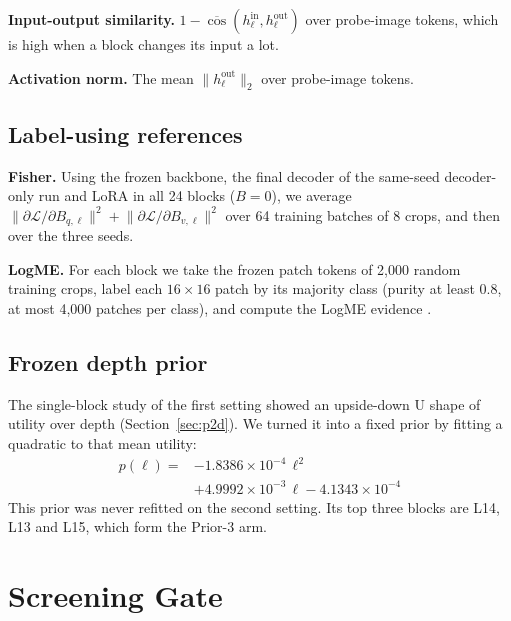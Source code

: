 \documentclass[11pt,a4paper]{report}
\begin{document}
\textbf{Input-output similarity.} $1 - \overline{\cos}(h_\ell^{\text{in}}, h_\ell^{\text{out}})$ over probe-image tokens, which is high when a block changes its input a lot.

\textbf{Activation norm.} The mean $\lVert h_\ell^{\text{out}} \rVert_2$ over probe-image tokens.

\subsection{Label-using references}

\textbf{Fisher.} Using the frozen backbone, the final decoder of the same-seed decoder-only run and LoRA in all 24 blocks ($B = 0$), we average $\lVert \partial \mathcal{L} / \partial B_{q,\ell} \rVert^2 + \lVert \partial \mathcal{L} / \partial B_{v,\ell} \rVert^2$ over 64 training batches of 8 crops, and then over the three seeds.

\textbf{LogME.} For each block we take the frozen patch tokens of 2,000 random training crops, label each $16 \times 16$ patch by its majority class (purity at least 0.8, at most 4,000 patches per class), and compute the LogME evidence \cite{you2021logme}.

\subsection{Frozen depth prior}

The single-block study of the first setting showed an upside-down U shape of utility over depth (Section~\ref{sec:p2d}). We turned it into a fixed prior by fitting a quadratic to that mean utility:
\begin{equation}
\begin{split}
    p(\ell) = {} & -1.8386 \times 10^{-4}\,\ell^2 \\
    & + 4.9992 \times 10^{-3}\,\ell - 4.1343 \times 10^{-4}
\end{split}
\end{equation}
This prior was never refitted on the second setting. Its top three blocks are L14, L13 and L15, which form the Prior-3 arm.

\section{Screening Gate}
\end{document}
